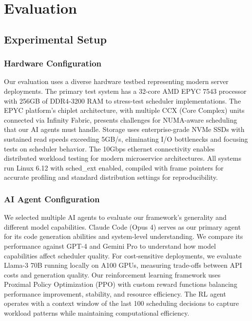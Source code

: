 \section{Evaluation}

\subsection{Experimental Setup}

\subsubsection{Hardware Configuration}
Our evaluation uses a diverse hardware testbed representing modern server deployments. The primary test system has a 32-core AMD EPYC 7543 processor with 256GB of DDR4-3200 RAM to stress-test scheduler implementations. The EPYC platform's chiplet architecture, with multiple CCX (Core Complex) units connected via Infinity Fabric, presents challenges for NUMA-aware scheduling that our AI agents must handle. Storage uses enterprise-grade NVMe SSDs with sustained read speeds exceeding 5GB/s, eliminating I/O bottlenecks and focusing tests on scheduler behavior. The 10Gbps ethernet connectivity enables distributed workload testing for modern microservice architectures. All systems run Linux 6.12 with sched\_ext enabled, compiled with frame pointers for accurate profiling and standard distribution settings for reproducibility.

\subsubsection{AI Agent Configuration}
We selected multiple AI agents to evaluate our framework's generality and different model capabilities. Claude Code (Opus 4) serves as our primary agent for its code generation abilities and system-level understanding. We compare its performance against GPT-4 and Gemini Pro to understand how model capabilities affect scheduler quality. For cost-sensitive deployments, we evaluate Llama-3 70B running locally on A100 GPUs, measuring trade-offs between API costs and generation quality. Our reinforcement learning framework uses Proximal Policy Optimization (PPO) with custom reward functions balancing performance improvement, stability, and resource efficiency. The RL agent operates with a context window of the last 100 scheduling decisions to capture workload patterns while maintaining computational efficiency.

